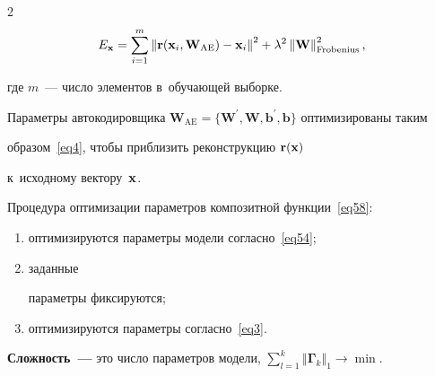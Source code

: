 \begin{multicols}{2}
\begin{equation}


\!\!\!E_\mathbf{x} = 


\sum\limits_{i=1}^m\left\Vert\mathbf{r}(\mathbf{x}_i,\mathbf{W}_{\mathrm{AE}}


) - \x_i\right\Vert^2 + 


\lambda^2\left\Vert\mathbf{W}\right\Vert_{\mathrm{Frobenius}}^2,\!\!


\label{eq54}


\end{equation}


где $m$~--- число элементов в~обучающей выборке.


Параметры автокодировщика $\mathbf{W}_{\mathrm{AE}} = 


\{\mathbf{W}^{'},\mathbf{W},\mathbf{b}^{'},\mathbf{b}\}$ оптимизированы таким 


образом~\eqref{eq4}, чтобы приблизить реконструкцию $\mathbf{r}({\mathbf{x}})$ 


к~исходному вектору~${\mathbf{x}}$.





Процедура оптимизации параметров композитной функции~\eqref{eq58}: 


\begin{enumerate}[(1)]


\item оптимизируются параметры модели согласно~\eqref{eq54}; 


\item заданные 


параметры фиксируются; 


\item оптимизируются параметры согласно~\eqref{eq3}.


\end{enumerate}







\textbf{Сложность~---} это число параметров модели, $\sum\nolimits_{l = 1}^k


\left\Vert\boldsymbol{\Gamma}_k\right\Vert_1 \rightarrow \min.$








\end{multicols}
